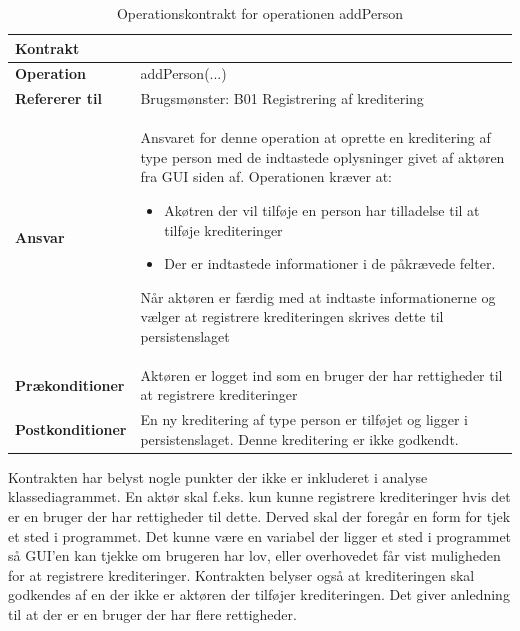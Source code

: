 \begin{table}[H]
\centering
\label{tab:2}
    \begin{tabular}{|p{35mm}|p{115mm}|} \hline
        \textbf{Kontrakt} &  \\ \hline
        \textbf{Operation} & addPerson(...) \\ \hline
        \textbf{Refererer til} & Brugsmønster: B01 Registrering af kreditering \\ \hline
        \textbf{Ansvar} & Ansvaret for denne operation at oprette en kreditering af type person med de indtastede oplysninger givet af aktøren fra GUI siden af. Operationen kræver at:
        \begin{itemize}
            \item Akøtren der vil tilføje en person har tilladelse til at tilføje krediteringer
            \item Der er indtastede informationer i de påkrævede felter. 
        \end{itemize}
        Når aktøren er færdig med at indtaste informationerne og vælger at registrere krediteringen skrives dette til persistenslaget
        \\ \hline
        \textbf{Prækonditioner} & Aktøren er logget ind som en bruger der har rettigheder til at registrere krediteringer\\ \hline
        \textbf{Postkonditioner} &
        En ny kreditering af type person er tilføjet og ligger i persistenslaget. Denne kreditering er ikke godkendt.\\ \hline
    \end{tabular}
        \caption{Operationskontrakt for operationen addPerson}
        \label{tab:OperationsKontraktB01}
\end{table}

Kontrakten har belyst nogle punkter der ikke er inkluderet i analyse klassediagrammet. En aktør skal f.eks. kun kunne registrere krediteringer hvis det er en bruger der har rettigheder til dette. Derved skal der foregår en form for tjek et sted i programmet. Det kunne være en variabel der ligger et sted i programmet så GUI'en kan tjekke om brugeren har lov, eller overhovedet får vist muligheden for at registrere krediteringer. Kontrakten belyser også at krediteringen skal godkendes af en der ikke er aktøren der tilføjer krediteringen. Det giver anledning til at der er en bruger der har flere rettigheder.
 
